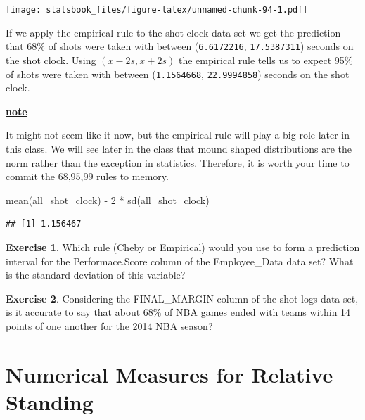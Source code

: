 \documentclass[
]{book}
\newenvironment{Shaded}{\begin{snugshade}}{\end{snugshade}}
\newcommand{\DecValTok}[1]{\textcolor[rgb]{0.00,0.00,0.81}{#1}}
\newcommand{\FunctionTok}[1]{\textcolor[rgb]{0.00,0.00,0.00}{#1}}
\newcommand{\NormalTok}[1]{#1}
\newcommand{\SpecialCharTok}[1]{\textcolor[rgb]{0.00,0.00,0.00}{#1}}
\newenvironment{rmdblock}[1]
  {\begin{shaded*}
  \centerline{\underline{\textbf{#1}}}

  }
  {
  \end{shaded*}
  }
\newenvironment{note}
  {\begin{rmdblock}{note}}
  {\end{rmdblock}}
\theoremstyle{definition}
\theoremstyle{definition}
\theoremstyle{definition}
\newtheorem{exercise}{Exercise}[chapter]
\theoremstyle{definition}
\theoremstyle{remark}
\begin{document}
\texttt{[image: statsbook\_files/figure-latex/unnamed-chunk-94-1.pdf]}

If we apply the empirical rule to the shot clock data set we get the prediction that 68\% of shots were taken with between (\texttt{6.6172216}, \texttt{17.5387311}) seconds on the shot clock. Using \((\bar{x}-2s, \bar{x}+2s)\) the empirical rule tells us to expect 95\% of shots were taken with between (\texttt{1.1564668}, \texttt{22.9994858}) seconds on the shot clock.

\begin{note}
It might not seem like it now, but the empirical rule will play a big role later in this class. We will see later in the class that mound shaped distributions are the norm rather than the exception in statistics. Therefore, it is worth your time to commit the 68,95,99 rules to memory.
\end{note}

\begin{Shaded}
\begin{Highlighting}[]
\FunctionTok{mean}\NormalTok{(all\_shot\_clock) }\SpecialCharTok{{-}} \DecValTok{2} \SpecialCharTok{*} \FunctionTok{sd}\NormalTok{(all\_shot\_clock)}
\end{Highlighting}
\end{Shaded}

\begin{verbatim}
## [1] 1.156467
\end{verbatim}

\begin{exercise}
\protect\hypertarget{exr:unnamed-chunk-97}{}\label{exr:unnamed-chunk-97}Which rule (Cheby or Empirical) would you use to form a prediction interval for the Performace.Score column of the Employee\_Data data set? What is the standard deviation of this variable?
\end{exercise}

\begin{exercise}
\protect\hypertarget{exr:unnamed-chunk-98}{}\label{exr:unnamed-chunk-98}Considering the FINAL\_MARGIN column of the shot logs data set, is it accurate to say that about 68\% of NBA games ended with teams within 14 points of one another for the 2014 NBA season?
\end{exercise}

\hypertarget{numerical-measures-for-relative-standing}{%
\section{Numerical Measures for Relative Standing}\label{numerical-measures-for-relative-standing}}
\end{document}
